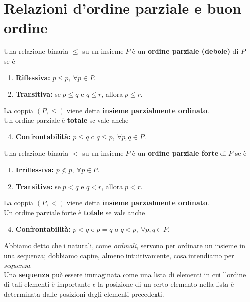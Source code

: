\section{Relazioni d'ordine parziale e buon ordine}
\begin{define}
	Una relazione binaria $\leq$ su un insieme $P$ è un \textbf{ordine parziale (debole)} di $P$ se è
	\begin{enumerate}
		\item \textbf{Riflessiva:} $p\leq p,\ \forall p\in P$.
		\item \textbf{Transitiva:} se $p\leq q$ e $q\leq r$, allora $p\leq r$.
	\end{enumerate}
	La coppia $\left(P,\leq\right)$ viene detta \textbf{insieme parzialmente ordinato}.\\
	Un ordine parziale è \textbf{totale} se vale anche
	\begin{enumerate}
		\setcounter{enumi}{3}
		\item \textbf{Confrontabilità:} $p\leq q$ o $q\leq p,\ \forall p,q\in P$.
	\end{enumerate}
\end{define}
\begin{define}
	Una relazione binaria $<$ su un insieme $P$ è un \textbf{ordine parziale forte} di $P$ se è
	\begin{enumerate}
		\item \textbf{Irriflessiva:} $p\nless p,\ \forall p\in P$.
		\item \textbf{Transitiva:} se $p<q$ e $q<r$, allora $p<r$.
	\end{enumerate}
	La coppia $\left(P,<\right)$ viene detta \textbf{insieme parzialmente ordinato}.\\
	Un ordine parziale forte è \textbf{totale} se vale anche
	\begin{enumerate}
		\setcounter{enumi}{3}
		\item \textbf{Confrontabilità:} $p<q$ o $p=q$ o $q<p,\ \forall p,q\in P$.
	\end{enumerate}
\end{define}
Abbiamo detto che i naturali, come \textit{ordinali}, servono per ordinare un insieme in una sequenza; dobbiamo capire, almeno intuitivamente, cosa intendiamo per \textit{sequenza}.\\
Una \textbf{sequenza} può essere immaginata come una lista di elementi in cui l'ordine di tali elementi è importante e la posizione di un certo elemento nella lista è determinata dalle posizioni degli elementi precedenti.\\
